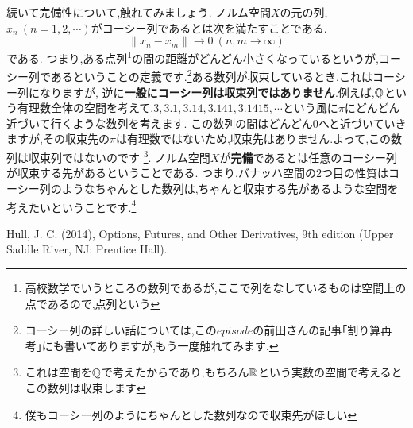 続いて完備性について,触れてみましょう.
ノルム空間$X$の元の列,$x_n \ (n=1,2,\cdots)$がコーシー列であるとは次を満たすことである.
\[
\| x_n - x_m \| \to 0 \ (n,m \to \infty)
\]
である.
つまり,ある点列\footnote{高校数学でいうところの数列であるが,ここで列をなしているものは空間上の点であるので,点列という}の間の距離がどんどん小さくなっているというが,コーシー列であるということの定義です.\footnote{コーシー列の詳しい話については,この$episode$の前田さんの記事｢割り算再考｣にも書いてありますが,もう一度触れてみます.}ある数列が収束しているとき,これはコーシー列になりますが,
逆に{\bf 一般にコーシー列は収束列ではありません}.例えば,$\mathbb Q$という有理数全体の空間を考えて,$3,3.1,3.14,3.141,3.1415,\cdots$という風に$\pi$にどんどん近づいて行くような数列を考えます.
この数列の間はどんどん$0$へと近づいていきますが,その収束先の$\pi$は有理数ではないため,収束先はありません.よって,この数列は収束列ではないのです
\footnote{これは空間を$\mathbb Q$で考えたからであり,もちろん$\mathbb R$という実数の空間で考えるとこの数列は収束します}.
ノルム空間$X$が{\bf 完備}であるとは任意のコーシー列が収束する先があるということである.
つまり,バナッハ空間の$2$つ目の性質はコーシー列のようなちゃんとした数列は,ちゃんと収束する先があるような空間を考えたいということです.\footnote{僕もコーシー列のようにちゃんとした数列なので収束先がほしい}
\begin{thebibliography}{9}
\item Hull, J. C. (2014), Options, Futures, and Other Derivatives, 9th edition (Upper Saddle River, NJ: Prentice Hall).
\end{thebibliography}
